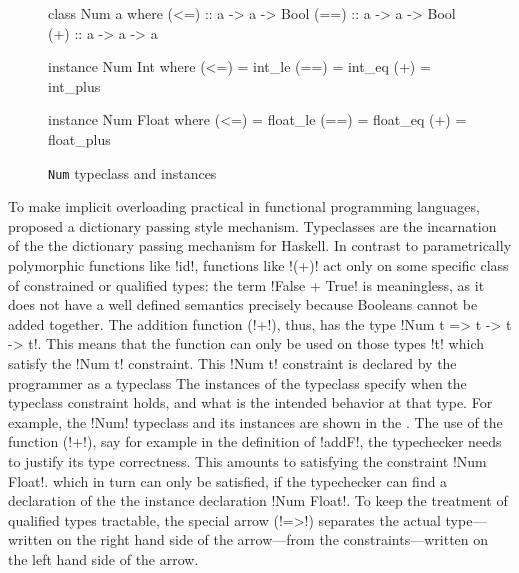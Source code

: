 \documentclass[screen,nonacm]{acmart}
\begin{document}
\begin{figure}[ht]
\centering
\begin{minipage}[ht]{0.3\linewidth}
\begin{CenteredBox}
\begin{code}
class Num a where
  (<=) :: a -> a -> Bool
  (==) :: a -> a -> Bool
  (+) :: a -> a -> a
\end{code}
\end{CenteredBox}
\end{minipage}%
\begin{minipage}[ht]{0.3\linewidth}
\begin{CenteredBox}
\begin{code}
instance Num Int where
  (<=) = int_le
  (==) = int_eq
  (+) = int_plus
\end{code}
\end{CenteredBox}
\end{minipage}%
\begin{minipage}[ht]{0.3\linewidth}
\begin{CenteredBox}
\begin{code}
instance Num Float where
  (<=) = float_le
  (==) = float_eq
  (+) = float_plus
\end{code}
\end{CenteredBox}
\end{minipage}
\caption{\lstinline{Num} typeclass and instances}
\label{fig:tc-num}
\end{figure}

To make implicit overloading practical in functional programming languages,
\citet{wadler_polymorphism_1989} proposed a dictionary passing style
mechanism. Typeclasses are the incarnation of the the dictionary passing mechanism for
Haskell. In contrast to parametrically polymorphic functions like
!id!, functions like !(+)! act only on some specific class of constrained or qualified
types\cite{jones_qualified_1994}: the term !False + True! is meaningless, as it does not have a well
defined semantics precisely because Booleans cannot be added
together. The addition function (!+!), thus, has the type
!Num t => t -> t -> t!. This means that the function can only be used
on those types !t! which satisfy the !Num t! constraint. This !Num t!
constraint is declared by the programmer as a typeclass The instances
of the typeclass specify when the typeclass
constraint holds, and what is the intended behavior at that type. For
example, the !Num! typeclass and its instances are shown in the
. The use of the function (!+!), say for
example in the definition of !addF!, the typechecker needs to justify
its type correctness. This amounts to satisfying the constraint !Num Float!.
which in turn can only be satisfied, if the typechecker can find a declaration of the
the instance declaration !Num Float!. To keep the treatment of qualified types
tractable, the special arrow (!=>!) separates the actual type---written on
the right hand side of the arrow---from the constraints---written on the left hand side of the arrow.
\end{document}
